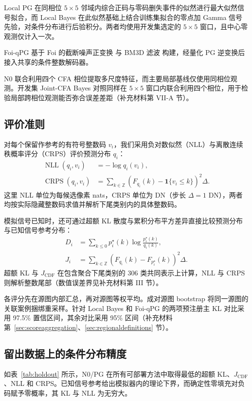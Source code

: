 \documentclass[10pt,twocolumn,journal]{IEEEtran}
\DeclareMathOperator{\NLL}{NLL}
\DeclareMathOperator{\CRPS}{CRPS}
\begin{document}
Local PG 在同相位 $5\times5$ 邻域内综合正码与零码删失事件的似然进行最大似然信号拟合，而 Local Bayes 在此似然基础上结合训练集拟合的零点加 Gamma 信号先验，对条件分布进行后验积分。两者均使用开发集选定的 $5\times5$ 窗口，且中心零观测仅计入一次。

Foi-qPG 基于 Foi 的截断噪声正变换 \cite{foi2009} 与 BM3D 滤波 \cite{bm3d} 构建，经量化 PG 逆变换后接入共享的条件整数解码器。

N0 联合利用四个 CFA 相位提取多尺度特征，而主要局部基线仅使用同相位观测。开发集 Joint-CFA Bayes 对照同样在 $5\times5$ 窗口内联合利用四个相位，用于检验局部跨相位观测能否弥合误差差距（补充材料第 VII-A 节）。

\subsection{评价准则}
对每个保留作参考的有符号整数码 $v_i$，我们采用负对数似然（NLL）与离散连续秩概率评分（CRPS）评价预测分布 $q_i$：
\begin{align}
\NLL(q_i,v_i)&=-\log q_i(v_i),\label{eq:nll}\\
\CRPS(q_i,v_i)&=\sum_{k\in\mathbb Z}
\left(F_{q_i}(k)-\mathbf{1}\{v_i\leq k\}\right)^2\Delta.\label{eq:crps}
\end{align}
这里 NLL 单位为每候选像素 nats，CRPS 单位为 DN（步长 $\Delta=1$ DN），两者均按实际隐藏整数码求值并解析下尾类别内的具体整数码。

模拟信号已知时，还可通过超额 KL 散度与累积分布平方差异直接比较预测分布与已知信号参考分布：
\begin{align}
D_i&=\sum_{k\leq0}p^{\star}_i(k)\log\frac{p^{\star}_i(k)}{q_i(k)},\label{eq:kl}\\
J_i&=\sum_{k\in\mathbb Z}\left(F_{q_i}(k)-F_{p^{\star}_i}(k)\right)^2\Delta.\label{eq:cdf}
\end{align}
超额 KL 与 $J_{\mathrm{CDF}}$ 在包含聚合下尾类别的 306 类共同表示上计算，NLL 与 CRPS 则解析整数尾部（数值误差界见补充材料第 III 节）。

各评分先在源图内部汇总，再对源图等权平均。成对源图 bootstrap 将同一源图的关联案例捆绑重采样。针对 Local Bayes 和 Foi-qPG 的两项预注册主 KL 对比采用 97.5\% 置信区间，其余对比采用 95\% 区间（补充材料第~\ref{sec:scoreaggregation}、\ref{sec:regionaldefinitions} 节）。

\subsection{留出数据上的条件分布精度}
如表~\ref{tab:holdout} 所示，N0/PG 在所有可部署方法中取得最低的超额 KL、$J_{\mathrm{CDF}}$、NLL 和 CRPS。已知信号参考给出模拟器内的理论下界，而确定性零填充对负码赋予零概率，其 KL 与 NLL 为无穷大。
\end{document}
